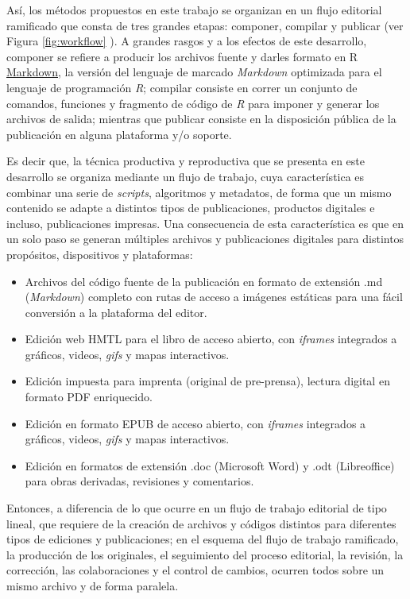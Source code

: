 \documentclass[
]{book}
\providecommand{\tightlist}{%
  \setlength{\itemsep}{0pt}\setlength{\parskip}{0pt}}
\begin{document}
Así, los métodos propuestos en este trabajo se organizan en un flujo editorial ramificado \citep{ramiroEdicionDigitalComo2018} que consta de tres grandes etapas: componer, compilar y publicar (ver Figura \ref{fig:workflow} ). A grandes rasgos y a los efectos de este desarrollo, componer se refiere a producir los archivos fuente y darles formato en R \href{https://es.wikipedia.org/wiki/Markdown}{Markdown}, la versión del lenguaje de marcado \emph{Markdown} optimizada para el lenguaje de programación \emph{R}; compilar consiste en correr un conjunto de comandos, funciones y fragmento de código de \emph{R} para imponer y generar los archivos de salida; mientras que publicar consiste en la disposición pública de la publicación en alguna plataforma y/o soporte.

Es decir que, la técnica productiva y reproductiva que se presenta en este desarrollo se organiza mediante un flujo de trabajo, cuya característica es combinar una serie de \emph{scripts}, algoritmos y metadatos, de forma que un mismo contenido se adapte a distintos tipos de publicaciones, productos digitales e incluso, publicaciones impresas. Una consecuencia de esta característica es que en un solo paso se generan múltiples archivos y publicaciones digitales para distintos propósitos, dispositivos y plataformas:

\begin{itemize}
\tightlist
\item
  Archivos del código fuente de la publicación en formato de extensión .md (\emph{Markdown}) completo con rutas de acceso a imágenes estáticas para una fácil conversión a la plataforma del editor.
\item
  Edición web HMTL para el libro de acceso abierto, con \emph{iframes} integrados a gráficos, videos, \emph{gifs} y mapas interactivos.
\item
  Edición impuesta para imprenta (original de pre-prensa), lectura digital en formato PDF enriquecido.
\item
  Edición en formato EPUB de acceso abierto, con \emph{iframes} integrados a gráficos, videos, \emph{gifs} y mapas interactivos.
\item
  Edición en formatos de extensión .doc (Microsoft Word) y .odt (Libreoffice) para obras derivadas, revisiones y comentarios.
\end{itemize}

Entonces, a diferencia de lo que ocurre en un flujo de trabajo editorial de tipo lineal, que requiere de la creación de archivos y códigos distintos para diferentes tipos de ediciones y publicaciones; en el esquema del flujo de trabajo ramificado, la producción de los originales, el seguimiento del proceso editorial, la revisión, la corrección, las colaboraciones y el control de cambios, ocurren todos sobre un mismo archivo y de forma paralela.
\end{document}
